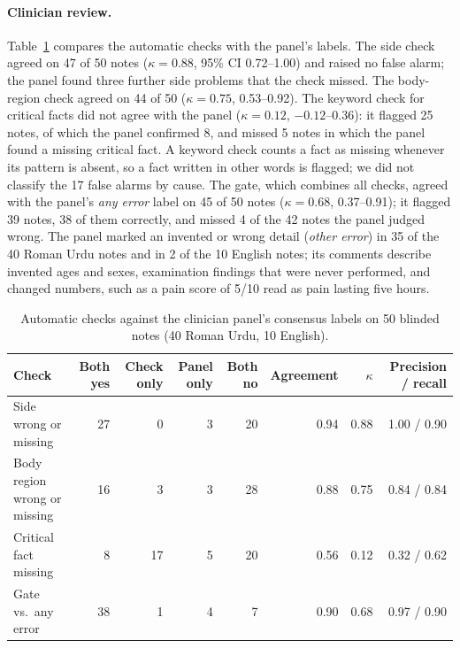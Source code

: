 \documentclass[11pt]{article}
\begin{document}
\paragraph{Clinician review.} Table~\ref{tab:review} compares the automatic checks with the panel's labels. The side check agreed on 47 of 50 notes ($\kappa=0.88$, 95\% CI 0.72--1.00) and raised no false alarm; the panel found three further side problems that the check missed. The body-region check agreed on 44 of 50 ($\kappa=0.75$, 0.53--0.92). The keyword check for critical facts did not agree with the panel ($\kappa=0.12$, $-0.12$--0.36): it flagged 25 notes, of which the panel confirmed 8, and missed 5 notes in which the panel found a missing critical fact. A keyword check counts a fact as missing whenever its pattern is absent, so a fact written in other words is flagged; we did not classify the 17 false alarms by cause. The gate, which combines all checks, agreed with the panel's \emph{any error} label on 45 of 50 notes ($\kappa=0.68$, 0.37--0.91); it flagged 39 notes, 38 of them correctly, and missed 4 of the 42 notes the panel judged wrong. The panel marked an invented or wrong detail (\emph{other error}) in 35 of the 40 Roman Urdu notes and in 2 of the 10 English notes; its comments describe invented ages and sexes, examination findings that were never performed, and changed numbers, such as a pain score of 5/10 read as pain lasting five hours.

\begin{table}[t]
\centering
\small
\begin{tabular}{lrrrrrrr}
\toprule
Check & Both yes & Check only & Panel only & Both no & Agreement & $\kappa$ & Precision / recall\\
\midrule
Side wrong or missing & 27 & 0 & 3 & 20 & 0.94 & 0.88 & 1.00 / 0.90\\
Body region wrong or missing & 16 & 3 & 3 & 28 & 0.88 & 0.75 & 0.84 / 0.84\\
Critical fact missing & 8 & 17 & 5 & 20 & 0.56 & 0.12 & 0.32 / 0.62\\
Gate vs.\ any error & 38 & 1 & 4 & 7 & 0.90 & 0.68 & 0.97 / 0.90\\
\bottomrule
\end{tabular}
\caption{Automatic checks against the clinician panel's consensus labels on 50 blinded notes (40 Roman Urdu, 10 English).}
\label{tab:review}
\end{table}
\end{document}

